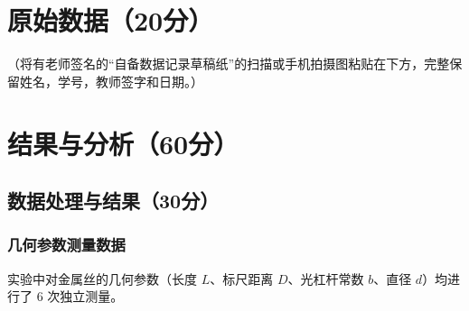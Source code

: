 \documentclass{../template/Report}%
\begin{document}
\begin{fullreportonly}
    \section{原始数据（20分）}
    （将有老师签名的“自备数据记录草稿纸”的扫描或手机拍摄图粘贴在下方，完整保留姓名，学号，教师签字和日期。）

    \section{结果与分析（60分）}

    \subsection{数据处理与结果（30分）}

    \subsubsection{几何参数测量数据}
    实验中对金属丝的几何参数（长度 $L$、标尺距离 $D$、光杠杆常数 $b$、直径 $d$）均进行了 6 次独立测量。


\end{fullreportonly}
\end{document}
